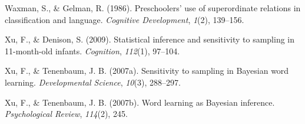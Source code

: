 \documentclass[english,floatsintext,man]{apa6}
\theoremstyle{definition}
\theoremstyle{definition}
\theoremstyle{definition}
\theoremstyle{remark}
\begin{document}
\hypertarget{ref-waxman1986}{}
Waxman, S., \& Gelman, R. (1986). Preschoolers' use of superordinate
relations in classification and language. \emph{Cognitive Development},
\emph{1}(2), 139--156.

\hypertarget{ref-xu2009}{}
Xu, F., \& Denison, S. (2009). Statistical inference and sensitivity to
sampling in 11-month-old infants. \emph{Cognition}, \emph{112}(1),
97--104.

\hypertarget{ref-xu2007b}{}
Xu, F., \& Tenenbaum, J. B. (2007a). Sensitivity to sampling in Bayesian
word learning. \emph{Developmental Science}, \emph{10}(3), 288--297.

\hypertarget{ref-xu2007word}{}
Xu, F., \& Tenenbaum, J. B. (2007b). Word learning as Bayesian
inference. \emph{Psychological Review}, \emph{114}(2), 245.
\end{document}
